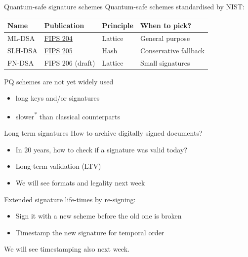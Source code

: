 \begin{frame}{Quantum-safe signature schemes}
  Quantum-safe schemes standardised by NIST:
  \begin{table}
  \small
  \begin{tabular}{@{}llll@{}}
    \toprule
    Name & Publication & Principle & When to pick?\\
    \midrule
    ML-DSA  & \href{https://csrc.nist.gov/pubs/fips/204/final}{FIPS 204} & Lattice & General purpose \\
    SLH-DSA & \href{https://csrc.nist.gov/pubs/fips/205/final}{FIPS 205} & Hash    & Conservative fallback \\
    FN-DSA  & FIPS 206 (draft)                                           & Lattice & Small signatures \\
    \bottomrule
  \end{tabular}
  \end{table}

  \vspace{0.5em}

  \pause
  PQ schemes are not yet widely used
  \begin{itemize}
    \item long keys and/or signatures
    \item slower\textsuperscript{*} than classical counterparts
  \end{itemize}
\end{frame}

\begin{frame}{Long term signatures}
  How to archive digitally signed documents?
  \begin{itemize}[<+(1)->]
    \item In 20 years, how to check if a signature was valid today?
    \item Long-term validation (LTV)
    \item We will see formats and legality next week
  \end{itemize}

  \vspace*{0.5em}

  \pause
  Extended signature life-times by re-signing:
  \begin{itemize}[<+(1)->]
    \item Sign it with a new scheme before the old one is broken
    \item Timestamp the new signature for temporal order
  \end{itemize}

  \pause
  We will see timestamping also next week.
\end{frame}


